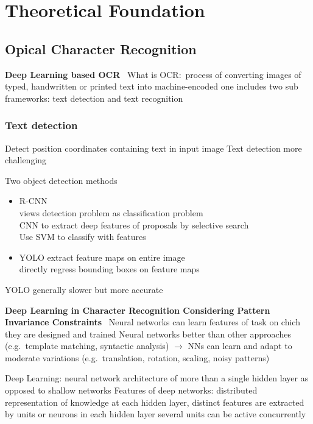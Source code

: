 \chapter{Theoretical Foundation}
\section{Opical Character Recognition}

\textbf{Deep Learning based OCR}~\cite{zhao_improving_2020}
What is OCR:\ process of converting images of typed, handwritten or printed text into machine-encoded one
includes two sub frameworks: text detection and text recognition

\subsection{Text detection}
Detect position coordinates containing text in input image
Text detection more challenging

Two object detection methods
\begin{itemize}
    \item R-CNN\\
        views detection problem as classification problem\\
        CNN to extract deep features of proposals by selective search\\ %
        Use SVM to classify with features
    \item YOLO
        extract feature maps on entire image\\
        directly regress bounding boxes on feature maps
\end{itemize}
YOLO generally slower but more accurate


\textbf{Deep Learning in Character Recognition Considering Pattern Invariance
Constraints}~\cite{oyedotun_deep_2015}
Neural networks can learn features of task on chich they are designed and trained
Neural networks better than other approaches (e.g.\ template matching, syntactic analysis)
$\rightarrow$ NNs can learn and adapt to moderate variations (e.g.\ translation, rotation, scaling,
noisy patterns)

Deep Learning: neural network architecture of more than a single hidden layer as opposed to shallow
networks
Features of deep networks: distributed representation of knowledge at each hidden layer, distinct
features are extracted by units or neurons in each hidden layer
several units can be active concurrently



